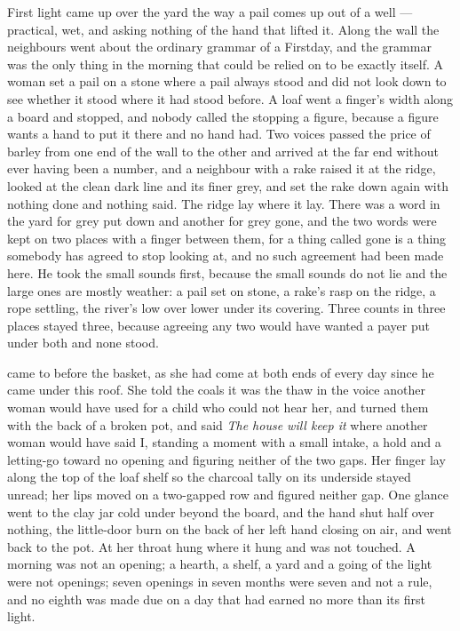 First light came up over the yard the way a pail comes up out of a well --- practical, wet, and asking nothing of the hand that lifted it. Along the wall the neighbours went about the ordinary grammar of a Firstday, and the grammar was the only thing in the morning that could be relied on to be exactly itself. A woman set a pail on a stone where a pail always stood and did not look down to see whether it stood where it had stood before. A loaf went a finger's width along a board and stopped, and nobody called the stopping a figure, because a figure wants a hand to put it there and no hand had. Two voices passed the price of barley from one end of the wall to the other and arrived at the far end without ever having been a number, and a neighbour with a rake raised it at the ridge, looked at the clean dark line and its finer grey, and set the rake down again with nothing done and nothing said. The ridge lay where it lay. There was a word in the yard for grey put down and another for grey gone, and the two words were kept on two places with a finger between them, for a thing called gone is a thing somebody has agreed to stop looking at, and no such agreement had been made here. He took the small sounds first, because the small sounds do not lie and the large ones are mostly weather: a pail set on stone, a rake's rasp on the ridge, a rope settling, the river's low over lower under its covering. Three counts in three places stayed three, because agreeing any two would have wanted a payer put under both and none stood.

 came to  before the basket, as she had come at both ends of every day since he came under this roof. She told the coals it was the thaw in the voice another woman would have used for a child who could not hear her, and turned them with the back of a broken pot, and said \emph{The house will keep it} where another woman would have said I, standing a moment with a small intake, a hold and a letting-go toward no opening and figuring neither of the two gaps. Her finger lay along the top of the loaf shelf so the charcoal tally on its underside stayed unread; her lips moved on a two-gapped row and figured neither gap. One glance went to the clay jar cold under  beyond the board, and the hand shut half over nothing, the little-door burn on the back of her left hand closing on air, and went back to the pot. At her throat  hung where it hung and was not touched. A morning was not an opening; a hearth, a shelf, a yard and a going of the light were not openings; seven openings in seven months were seven and not a rule, and no eighth was made due on a day that had earned no more than its first light.

